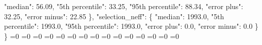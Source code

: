 {{        "median": 56.09, %
        "5th percentile": 33.25, %
        "95th percentile": 88.34, %
        "error plus": 32.25, %
        "error minus": 22.85%
      \}, %
      "selection\_neff": \{%
        "median": 1993.0, %
        "5th percentile": 1993.0, %
        "95th percentile": 1993.0, %
        "error plus": 0.0, %
        "error minus": 0.0%
      \}%
    \}}%
  \else%
    \ifnum{}=0%
      \let\MagTruncnormIndTiltIsotropicTruncnormNid@I@out\MagTruncnormIndTiltIsotropicTruncnormNid@III%
    \else%
      \ifnum{}=0%
      \let\MagTruncnormIndTiltIsotropicTruncnormNid@I@out\MagTruncnormIndTiltIsotropicTruncnormNid@IV%
    \else%
      \ifnum{}=0%
      \let\MagTruncnormIndTiltIsotropicTruncnormNid@I@out\MagTruncnormIndTiltIsotropicTruncnormNid@V%
    \else%
      \ifnum{}=0%
      \let\MagTruncnormIndTiltIsotropicTruncnormNid@I@out\MagTruncnormIndTiltIsotropicTruncnormNid@VI%
    \else%
      \ifnum{}=0%
      \let\MagTruncnormIndTiltIsotropicTruncnormNid@I@out\MagTruncnormIndTiltIsotropicTruncnormNid@VII%
    \else%
      \ifnum{}=0%
      \let\MagTruncnormIndTiltIsotropicTruncnormNid@I@out\MagTruncnormIndTiltIsotropicTruncnormNid@VIII%
    \else%
      \ifnum{}=0%
      \let\MagTruncnormIndTiltIsotropicTruncnormNid@I@out\MagTruncnormIndTiltIsotropicTruncnormNid@IX%
    \else%
      \ifnum{}=0%
      \let\MagTruncnormIndTiltIsotropicTruncnormNid@I@out\MagTruncnormIndTiltIsotropicTruncnormNid@X%
    \else%
      \ifnum{}=0%
      \let\MagTruncnormIndTiltIsotropicTruncnormNid@I@out\MagTruncnormIndTiltIsotropicTruncnormNid@XI%
    \else%
      \ifnum{}=0%
      \let\MagTruncnormIndTiltIsotropicTruncnormNid@I@out\MagTruncnormIndTiltIsotropicTruncnormNid@XII%
    \else%
      \ifnum{}=0%
      \let\MagTruncnormIndTiltIsotropicTruncnormNid@I@out\MagTruncnormIndTiltIsotropicTruncnormNid@XIII%
    \else%
      \ifnum{}=0%
      \let\MagTruncnormIndTiltIsotropicTruncnormNid@I@out\MagTruncnormIndTiltIsotropicTruncnormNid@XIV%
    \else%
      \ifnum{}=0%
      \let\MagTruncnormIndTiltIsotropicTruncnormNid@I@out\MagTruncnormIndTiltIsotropicTruncnormNid@XV%
    \else%
      \ifnum{}=0%
      \let\MagTruncnormIndTiltIsotropicTruncnormNid@I@out\MagTruncnormIndTiltIsotropicTruncnormNid@XVI%
    \else%
      \ifnum{}=0%
      \let\MagTruncnormIndTiltIsotropicTruncnormNid@I@out\MagTruncnormIndTiltIsotropicTruncnormNid@XVII%
}

